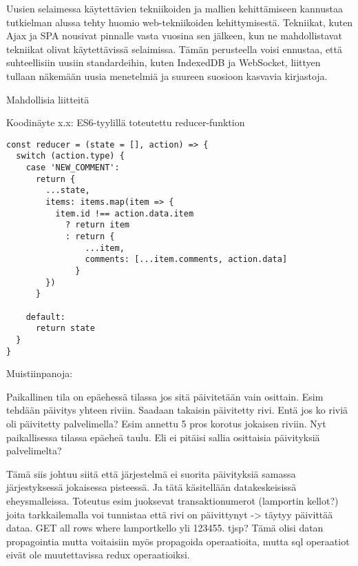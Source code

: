 \documentclass[finnish,twoside,censored,csm,sw-track-2018]{HYthesisML}
\begin{document}
Uusien selaimessa käytettävien tekniikoiden ja mallien kehittämiseen kannustaa tutkielman alussa tehty huomio web-tekniikoiden kehittymisestä. Tekniikat, kuten Ajax ja SPA nousivat pinnalle vasta vuosina sen jälkeen, kun ne mahdollistavat tekniikat olivat käytet\-tävissä selaimissa. Tämän perusteella voisi ennustaa, että suhteellisiin uusiin standardeihin, kuten IndexedDB ja WebSocket, liittyen tullaan näkemään uusia menetelmiä ja suureen suosioon kasvavia kirjastoja.


\cleardoublepage                          %
{}  %
\printbibliography
\backmatter

Mahdollisia liitteitä

Koodinäyte x.x: ES6-tyylillä toteutettu reducer-funktion

\begin{verbatim}
const reducer = (state = [], action) => {
  switch (action.type) {
    case 'NEW_COMMENT':
      return {
        ...state,
        items: items.map(item => {
          item.id !== action.data.item
            ? return item
            : return {
                ...item,
                comments: [...item.comments, action.data]
              }
        })
      }
    
    default:
      return state
  }
}
\end{verbatim}

Muistiinpanoja:

Paikallinen tila on epäehessä tilassa jos sitä päivitetään vain osittain. Esim tehdään päivitys yhteen riviin. Saadaan takaisin päivitetty rivi. Entä jos ko riviä oli päivitetty palvelimella? Esim annettu 5 pros korotus jokaisen riviin. Nyt paikallisessa tilassa epäeheä taulu. Eli ei pitäisi sallia osittaisia päivityksiä palvelimelta?

Tämä siis johtuu siitä että järjestelmä ei suorita päivityksiä samassa järjestyksessä jokaisessa pisteessä. Ja tätä käsitellään datakeskeisissä eheysmalleissa. Toteutus esim juoksevat transaktionumerot (lamportin kellot?) joita tarkkailemalla voi tunnistaa että rivi on päivittynyt -> täytyy päivittää dataa. GET all rows where lamportkello yli 123455. tjsp? Tämä olisi datan propagointia mutta voitaisiin myös propagoida operaatioita, mutta sql operaatiot eivät ole muutettavissa redux operaatioiksi.
\end{document}

